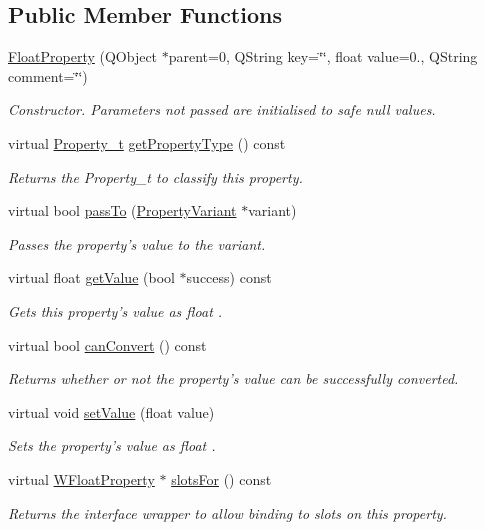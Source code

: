 \subsection*{Public Member Functions}
\begin{DoxyCompactItemize}
\item 
\hyperlink{class_float_property_a94120bb05019e3cfc064b8ef7ab86e00}{Float\-Property} (Q\-Object $\ast$parent=0, Q\-String key=\char`\"{}\char`\"{}, float value=0., Q\-String comment=\char`\"{}\char`\"{})
\begin{DoxyCompactList}\small\item\em Constructor. Parameters not passed are initialised to safe null values. \end{DoxyCompactList}\item 
virtual \hyperlink{group___property_classes_ga38f1ccddda12c7cb50b868c9f789ee37}{Property\-\_\-t} \hyperlink{class_float_property_ac224ce3448cbe08d9c1b28804233086b}{get\-Property\-Type} () const 
\begin{DoxyCompactList}\small\item\em Returns the Property\-\_\-t to classify this property. \end{DoxyCompactList}\item 
virtual bool \hyperlink{class_float_property_a811c6ebe512a45d4fba73cbfd486c8f6}{pass\-To} (\hyperlink{class_property_variant}{Property\-Variant} $\ast$variant)
\begin{DoxyCompactList}\small\item\em Passes the property's value to the variant. \end{DoxyCompactList}\item 
virtual float \hyperlink{class_float_property_a91854af44926b14c2264d16d71c06f11}{get\-Value} (bool $\ast$success) const 
\begin{DoxyCompactList}\small\item\em Gets this property's value as float . \end{DoxyCompactList}\item 
virtual bool \hyperlink{class_float_property_a38c95c8f0a4131f5fd8a4a09352ba984}{can\-Convert} () const 
\begin{DoxyCompactList}\small\item\em Returns whether or not the property's value can be successfully converted. \end{DoxyCompactList}\item 
virtual void \hyperlink{class_float_property_a24ef985394b6273da923cf0165620568}{set\-Value} (float value)
\begin{DoxyCompactList}\small\item\em Sets the property's value as float . \end{DoxyCompactList}\item 
virtual \hyperlink{class_w_float_property}{W\-Float\-Property} $\ast$ \hyperlink{class_float_property_aa8f23ba9718273d96802b051d510b087}{slots\-For} () const 
\begin{DoxyCompactList}\small\item\em Returns the interface wrapper to allow binding to slots on this property. \end{DoxyCompactList}\end{DoxyCompactItemize}
